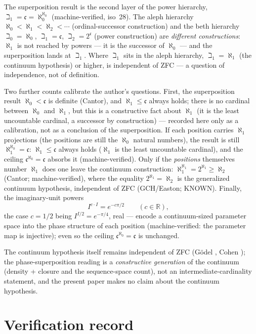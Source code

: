 \documentclass{article}
\begin{document}
The superposition result is the second layer of the power hierarchy,
$\beth_1=\mathfrak c=\aleph_0^{\aleph_0}$ (machine-verified, iso~28). The
aleph hierarchy $\aleph_0<\aleph_1<\aleph_2<\cdots$ (ordinal-successor
construction) and the beth hierarchy $\beth_0=\aleph_0$,
$\beth_1=\mathfrak c$, $\beth_2=2^{\mathfrak c}$ (power construction) are
\emph{different constructions}: $\aleph_1$ is not reached by powers ---
it is the successor of $\aleph_0$ --- and the superposition lands at
$\beth_1$. Where $\beth_1$ sits in the aleph hierarchy,
$\beth_1=\aleph_1$ (the continuum hypothesis) or higher, is independent of
ZFC --- a question of independence, not of definition.

Two further counts calibrate the author's questions. First, the
superposition result $\aleph_0<\mathfrak c$ is definite (Cantor), and
$\aleph_1\le\mathfrak c$ always holds; there is no cardinal between
$\aleph_0$ and $\aleph_1$, but this is a constructive fact about
$\aleph_1$ (it is the least uncountable cardinal, a successor by
construction) --- recorded here only as a calibration, not as a
conclusion of the superposition. If each position
carries $\aleph_1$ projections (the positions are still the $\aleph_0$
natural numbers), the result is still
$\aleph_1^{\aleph_0}=\mathfrak c$: $\aleph_1\le\mathfrak c$ always holds
($\aleph_1$ is the least uncountable cardinal), and the ceiling
$\mathfrak c^{\aleph_0}=\mathfrak c$ absorbs it (machine-verified).
Only if the \emph{positions} themselves number $\aleph_1$ does one leave
the continuum construction: $\aleph_1^{\aleph_1}=2^{\aleph_1}\ge\aleph_2$
(Cantor; machine-verified), where the equality $2^{\aleph_1}=\aleph_2$ is
the generalized continuum hypothesis, independent of ZFC
(GCH/Easton; KNOWN). Finally, the imaginary-unit powers
\[
I^{c\cdot I}=e^{-c\pi/2}\qquad(c\in\mathbb{R}),
\]
the case $c=1/2$ being $I^{I/2}=e^{-\pi/4}$, real --- encode a
continuum-sized parameter space into the phase structure of each
position (machine-verified: the parameter map is injective); even so
the ceiling $\mathfrak c^{\aleph_0}=\mathfrak c$ is unchanged.

The continuum hypothesis itself remains independent of ZFC (G\"odel
\cite{godel}, Cohen \cite{cohen}); the phase-superposition reading is a
\emph{constructive generation} of the continuum (density + closure and
the sequence-space count), not an intermediate-cardinality statement,
and the present paper makes no claim about the continuum hypothesis.

\section{Verification record}
\label{sec:verification}
\end{document}
